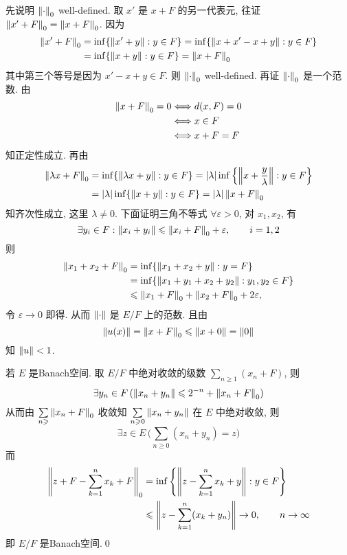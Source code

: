 \begin{Proof}
	先说明 $ \left\| \cdot \right\|_{0} $ well-defined. 取 $ x' $ 是 $ x+F $ 的另一代表元, 往证 $ \left\| x'+F \right\|_{0}=\left\| x+F \right\|_{0} $. 因为
	\[
		\begin{aligned}
			\left\| x'+F \right\|_{0} & =\inf\{ \left\| x'+y \right\|:y\in F \}  = \inf\{ \left\| x+x'-x+y \right\|: y\in F \} \\
			                & =\inf\{ \left\| x+y \right\|: y\in F \}=\left\| x+F \right\|_{0}
		\end{aligned}
	\]
	其中第三个等号是因为 $ x'-x+y\in F $. 则 $ \left\| \cdot \right\|_{0} $ well-defined. 再证 $ \left\| \cdot \right\|_{0} $ 是一个范数. 由
	\[
		\begin{aligned}
			\left\| x+F \right\|_{0}=0 & \Longleftrightarrow d(x, F)=0 \\
			                 & \Longleftrightarrow x\in F    \\
			                 & \Longleftrightarrow x+F=F
		\end{aligned}
	\]
	知正定性成立. 再由
	\[
		\begin{aligned}
			\left\| \lambda x+F \right\|_{0} & =\inf\{ \left\| \lambda x+y \right\|: y\in F \}=\left| \lambda \right| \inf\left\{ \left\| x+\frac{y}{\lambda} \right\|: y\in F \right\} \\
			                       & =\left| \lambda \right| \inf\{ \left\| x+y \right\|: y\in F \}=\left| \lambda \right| \left\| x+F \right\|_{0}
		\end{aligned}
	\]
	知齐次性成立, 这里 $ \lambda\neq0 $. 下面证明三角不等式 $ \forall\varepsilon>0 $, 对 $ x_{1}, x_{2} $, 有
	\[
		\exists y_{i}\in F : \left\| x_{i}+y_{i} \right\|\leqslant\left\| x_{i}+F \right\|_{0}+\varepsilon, \qquad i=1, 2
	\]
	则
	\[
		\begin{aligned}
			\left\| x_{1}+x_{2}+F \right\|_{0} & =\inf\{ \left\| x_{1}+x_{2}+y \right\|: y=F \}                          \\
			                         & =\inf\{ \left\| x_{1}+y_{1}+x_{2}+y_{2} \right\|: y_{1}, y_{2}\in F \}  \\
			                         & \leqslant \left\| x_{1}+F \right\|_{0}+\left\| x_{2}+F \right\|_{0}+2\varepsilon,
		\end{aligned}
	\]
	令 $ \varepsilon\to 0 $ 即得. 从而 $ \left\| \cdot \right\| $ 是 $ E/F $ 上的范数. 且由
	\[
		\left\| u(x) \right\|=\left\| x+F \right\|_{0}\leqslant \left\| x+0 \right\|=\left\| 0 \right\|
	\]
	知 $ \left\| u \right\|<1 $.

	若 $ E $ 是Banach空间. 取 $ E/F $ 中绝对收敛的级数 $ \sum\limits_{n\geqslant1}(x_{n}+F) $, 则
	\[
		\exists y_{n}\in F\,(\left\| x_{n}+y_{n} \right\|\leqslant 2^{-n}+\left\| x_{n}+F \right\|_{0})
	\]
	从而由 $ \sum\limits_{n\geqslant}\left\| x_{n}+F \right\|_{0} $ 收敛知 $ \sum\limits_{n\geqslant0}\left\| x_{n}+y_{n} \right\| $ 在 $ E $ 中绝对收敛, 则
	\[
		\exists z\in E\,\bigg( \sum_{n\geqslant0}(x_{n}+y_{n})=z \bigg)
	\]
	而
	\[
		\begin{aligned}
			\left\| z+F-\sum_{k=1}^{n}x_{k}+F \right\|_{0} & =\inf\left\{ \left\| z-\sum_{k=1}^{n}x_{k}+y \right\|:y\in F \right\}           \\
			                                     & \leqslant \left\| z-\sum_{k=1}^{n}(x_{k}+y_{n}) \right\|\to 0,\qquad n\to\infty
		\end{aligned}
	\]
	即 $ E/F $ 是Banach空间.\qed
\end{Proof}

